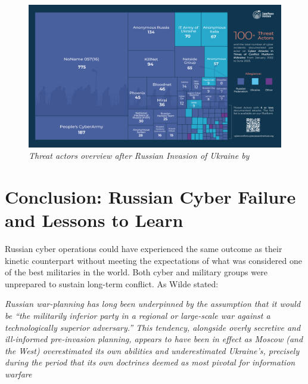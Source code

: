 \begin{figure}[H]
\centering
\includegraphics[width=1\textwidth]{Images/actors.png}
\caption{\textit{Threat actors overview after Russian Invasion of Ukraine by \textcite{cyberpeaceinstitute_2023_cyber}}}
\label{actors.png}
\end{figure}


\section{Conclusion: Russian Cyber Failure and Lessons to Learn}

Russian cyber operations could have experienced the same outcome as their kinetic counterpart without meeting the expectations of what was considered one of the best militaries in the world. Both cyber and military groups were unprepared to sustain long-term conflict. As Wilde stated:

\textit{Russian war-planning has long been underpinned by the assumption that it would be “the militarily inferior party in a regional or large-scale war against a technologically superior adversary.”  This tendency, alongside overly secretive and ill-informed pre-invasion planning, appears to have been in effect as Moscow (and the West) overestimated its own abilities and underestimated Ukraine’s, precisely during the period that its own doctrines deemed as most pivotal for information warfare \autocite{wilde_2022_cyber}}

